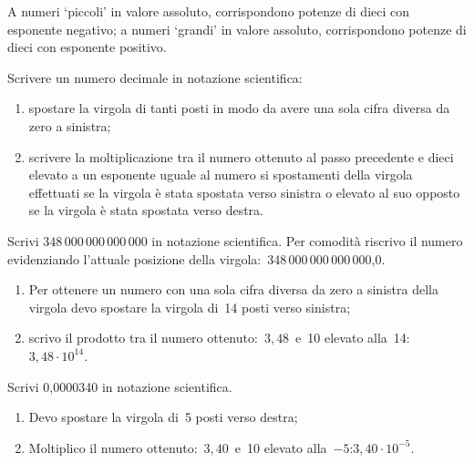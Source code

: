 \begin{osservazione}{}{}
A numeri `piccoli' in valore assoluto, corrispondono potenze di dieci con 
esponente negativo; 
a numeri `grandi' in valore assoluto, corrispondono potenze di dieci con 
esponente positivo.
\end{osservazione}


\begin{procedura}{}{}
Scrivere un numero decimale in notazione scientifica:
\begin{enumerate}[noitemsep, label=(\alph*)] %
\item spostare la virgola di tanti posti in modo da avere una sola cifra
diversa da zero a sinistra;
\item scrivere la moltiplicazione tra il numero ottenuto al passo 
precedente e dieci elevato a un esponente uguale al numero si spostamenti 
della virgola effettuati se la virgola è stata spostata verso sinistra o 
elevato al suo opposto se la virgola è stata spostata verso destra.
\end{enumerate}
\end{procedura}

\begin{esempio}{}{}
Scrivi 348\,000\,000\,000\,000 in notazione scientifica.
Per comodità riscrivo il numero evidenziando l'attuale 
posizione della virgola:~348\,000\,000\,000\,000,0.
\begin{enumerate}[noitemsep, label=(\alph*)]
\item Per ottenere un numero con una sola cifra diversa 
da zero a sinistra della virgola devo spostare la virgola di~14 posti 
verso sinistra;
\item scrivo il prodotto tra il numero 
ottenuto:~\(3,48\)~e~10 elevato alla~14: \quad 
\(3,48 \cdot 10^{14}\).
\end{enumerate}

\end{esempio}
\begin{esempio}{}{}
Scrivi 0,0000340 in notazione scientifica.
\begin{enumerate}[noitemsep, label=(\alph*)]
\item Devo spostare la virgola di~5 posti verso destra;
\item Moltiplico il numero ottenuto:~\(3,40\)~e~10 elevato 
alla~\(-5\):\quad\(3,40 \cdot 10^{-5}\).
\end{enumerate}
\end{esempio}


